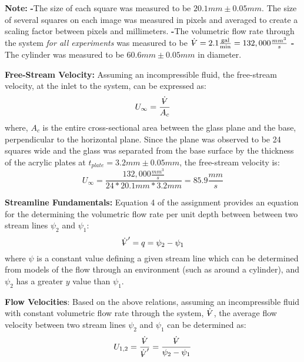 \documentclass[12pt]{article}
\makeatletter
\DeclareRobustCommand{\volume}{\text{\volumedash}V}
\newcommand{\volumedash}{%
	\makebox[0pt][l]{%
		\ooalign{\hfil\hphantom{$\m@th V$}\hfil\cr\kern0.08em--\hfil\cr}%
	}%
}
\makeatother
\begin{document}
	\hfill\break\break
	\textbf{Note:} \hfill\break
	\textbf{-}The size of each square was measured to be $20.1mm\pm0.05mm$. The size of several squares on each image was measured in pixels and averaged to create a scaling factor between pixels and millimeters.
	\hfill\break
	\textbf{-}The volumetric flow rate through the system \textit{for all experiments} was measured to be $\dot{\volume}=2.1 \frac{\textrm{gal}}{\textrm{min}}=132,000 \frac{mm^{3}}{s}$
	\hfill\break
	\textbf{-}The cylinder was measured to be $60.6mm\pm0.05mm$ in diameter.
	
	\hfill\break\break
	\textbf{Free-Stream Velocity:}
	Assuming an incompressible fluid, the free-stream velocity, at the inlet to the system, can be expressed as:
	$$U_{\infty}=\frac{\dot{\volume}}{A_{c}}$$
	where, ${A_{c}}$ is the entire cross-sectional area between the glass plane and the base, perpendicular to the horizontal plane. \hfill\break
	Since the plane was observed to be 24 squares wide and the glass was separated from the base surface by the thickness of the acrylic plates at $t_{plate}=3.2mm\pm0.05mm$, the free-stream velocity is:
	$$U_{\infty}=\frac{132,000\frac{mm^{3}}{s}}{24*20.1mm * 3.2mm}=85.9\frac{mm}{s}$$
	
	\hfill\break\break
	\textbf{Streamline Fundamentals:}
	Equation 4 of the assignment provides an equation for the determining the volumetric flow rate per unit depth between between two stream lines $\psi_{2}$ and $\psi_{1}$:
	$$\dot{\volume}'=q=\psi_{2}-\psi_{1}$$
	where $\psi$ is a constant value defining a given stream line which can be determined from models of the flow through an environment (such as around a cylinder), and $\psi_{2}$ has a greater $y$ value than $\psi_{1}$.
	
	\hfill\break\break
	\textbf{Flow Velocities}:
	Based on the above relations, assuming an incompressible fluid with constant volumetric flow rate through the system, $\dot{\volume}$, the average flow velocity between two stream lines $\psi_{2}$ and $\psi_{1}$ can be determined as:
	$$U_{1,2}= \frac{\dot{\volume}}{\dot{\volume}'}=\frac{\dot{\volume}}{\psi_{2}-\psi_{1}}$$
	
\end{document}
